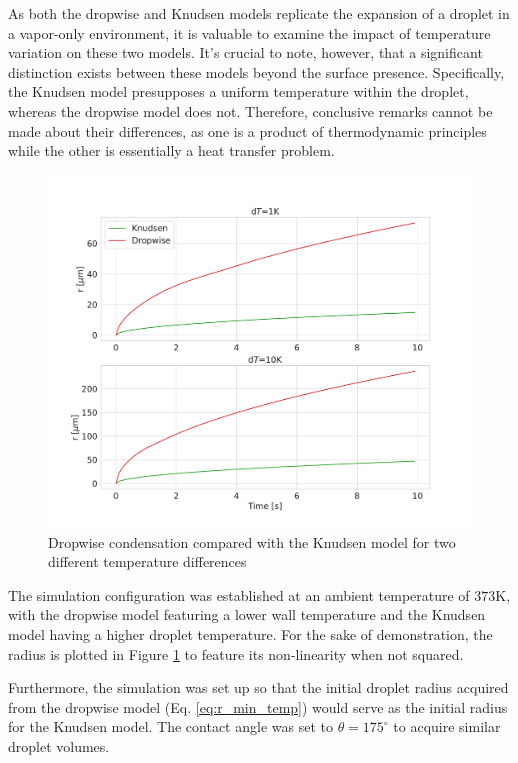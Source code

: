 \documentclass[12pt]{article}
\numberwithin{equation}{section}
\begin{document}
As both the dropwise and Knudsen models replicate the expansion of a droplet in a vapor-only environment, it is valuable to examine the impact of temperature variation on these two models. It's crucial to note, however, that a significant distinction exists between these models beyond the surface presence. Specifically, the Knudsen model presupposes a uniform temperature within the droplet, whereas the dropwise model does not. Therefore, conclusive remarks cannot be made about their differences, as one is a product of thermodynamic principles while the other is essentially a heat transfer problem.
\begin{figure}[H]
    \centering
    \includegraphics[trim={0 30 0 40},clip,width=1.0\textwidth]{Figures/r_knud_vs_dropwise.pdf}
    \caption{Dropwise condensation compared with the Knudsen model for two different temperature differences}
    \label{f:r_knud_vs_dropwise}
\end{figure}
The simulation configuration was established at an ambient temperature of $373\mathrm{K}$, with the dropwise model featuring a lower wall temperature and the Knudsen model having a higher droplet temperature. For the sake of demonstration, the radius is plotted in Figure \ref{f:r_knud_vs_dropwise} to feature its non-linearity when not squared.

Furthermore, the simulation was set up so that the initial droplet radius acquired from the dropwise model (Eq. \ref{eq:r_min_temp}) would serve as the initial radius for the Knudsen model. The contact angle was set to $\theta=175^\circ$ to acquire similar droplet volumes.
\end{document}
